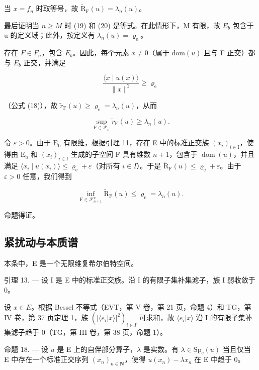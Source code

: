 当 \(x = f_{n}\) 时取等号，故 \(\widetilde{\mathrm{R}}_{\mathrm{F}}(u) = \lambda_{n}(u)\)。

最后证明当 \(n \geqslant M\) 时 (19) 和 (20) 是等式。在此情形下，M 有限，故 \(E_{b}\) 包含于 u 的定义域；此外，按定义有 \(\lambda_{n}(u) = \varrho_{\mathrm{e}}\)。

 存在 \(F \in F_{n}\)，包含 \(E_{b}\)。因此，每个元素 \(x \neq 0\)（属于 \(\text{dom}(u)\) 且与 F 正交）都与 \(E_{b}\) 正交，并满足

\[
\frac {\langle x \mid u (x) \rangle}{\| x \| ^ {2}} \geqslant \varrho_ {\mathrm{e}}
\]

（公式 (18)），故 \(\widetilde{r}_{\mathrm{F}}(u) \geqslant \varrho_{\mathrm{e}} = \lambda_n(u)\)，从而

\[
\sup _ {\mathrm{F} \in \mathcal {F} _ {n}} \widetilde {r} _ {\mathrm{F}} (u) \geqslant \lambda_ {n} (u).
\]

令 \(\varepsilon > 0\)。由于 \(\mathrm{E_b}\) 有限维，根据引理 11，存在 E 中的标准正交族 \((x_i)_{i \in \mathrm{I}}\)，使得由 \(\mathrm{E_b}\) 和 \((x_i)_{i \in \mathrm{I}}\) 生成的子空间 F 具有维数 \(n + 1\)，包含于 \(\operatorname{dom}(u)\)，并且满足 \(\langle x_{i} \mid u(x_{i})\rangle \leqslant \varrho_{\mathrm{e}} + \varepsilon\)（对所有 \(i \in I\)）。于是 \(\widetilde{\mathrm{R}}_{\mathrm{F}}(u) \leqslant \varrho_{\mathrm{e}} + \varepsilon\)。由于 \(\varepsilon > 0\) 任意，我们得到

\[
\inf _ {\mathrm{F} \in \mathcal {F} _ {n + 1} ^ {u}} \widetilde {\mathrm{R}} _ {\mathrm{F}} (u) \leqslant \varrho_ {\mathrm{e}} = \lambda_ {n} (u).
\]

命题得证。

\subsection{紧扰动与本质谱}

本条中，E 是一个无限维复希尔伯特空间。

引理 13. --- 设 I 是 E 中的标准正交族。沿 I 的有限子集补集滤子，族 I 弱收敛于 0。

设 \(x \in E\)。根据 Bessel 不等式（EVT，第 V 卷，第 21 页，命题 4）和 TG，第 IV 卷，第 37 页定理 1，族 \((|\langle e_{i} | x\rangle|^{2})_{i\in I}\) 可求和，故 \(\langle e_{i} | x\rangle\) 沿 I 的有限子集补集滤子趋于 0（TG，第 III 卷，第 38 页，命题 1）。

命题 18. --- 设 \(u\) 是 E 上的自伴部分算子，\(\lambda\) 是实数。有 \(\lambda \in \mathrm{Sp}_{\mathrm{e}}(u)\) 当且仅当 E 中存在一个标准正交序列 \((x_{n})_{n \in \mathbf{N}}\)，使得 \(u(x_{n}) - \lambda x_{n}\) 在 E 中趋于 0。

